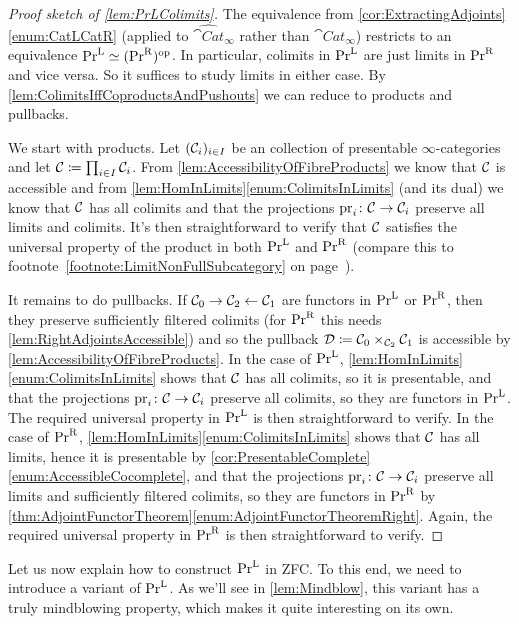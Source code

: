 \begin{proof}[Proof sketch of \cref{lem:PrLColimits}]
	The equivalence from \cref{cor:ExtractingAdjoints}\cref{enum:CatLCatR} (applied to $\widehat{\cat{Cat}}_\infty$ rather than $\cat{Cat}_\infty$) restricts to an equivalence $\mathrm{Pr}^{\mathrm{L}}\simeq (\mathrm{Pr}^{\mathrm{R}})^{\mathrm{op}}$. In particular, colimits in $\mathrm{Pr}^{\mathrm{L}}$ are just limits in $\mathrm{Pr}^{\mathrm{R}}$ and vice versa. So it suffices to study limits in either case. By \cref{lem:ColimitsIffCoproductsAndPushouts} we can reduce to products and pullbacks.
	
	We start with products. Let $(\mathcal{C}_i)_{i\in I}$ be an collection of presentable $\infty$-categories and let $\mathcal{C}\coloneqq \prod_{i\in I}\mathcal{C}_i$. From \cref{lem:AccessibilityOfFibreProducts} we know that $\mathcal{C}$ is accessible and from \cref{lem:HomInLimits}\cref{enum:ColimitsInLimits} (and its dual) we know that $\mathcal{C}$ has all colimits and that the projections $\operatorname{pr}_i\colon \mathcal{C}\rightarrow \mathcal{C}_i$ preserve all limits and colimits. It's then straightforward to verify that $\mathcal{C}$ satisfies the universal property of the product in both $\mathrm{Pr}^{\mathrm{L}}$ and $\mathrm{Pr}^{\mathrm{R}}$ (compare this to footnote~\cref{footnote:LimitNonFullSubcategory} on page~).
	
	It remains to do pullbacks. If $\mathcal{C}_0\rightarrow \mathcal{C}_2\leftarrow \mathcal{C}_1$ are functors in $\mathrm{Pr}^{\mathrm{L}}$ or $\mathrm{Pr}^{\mathrm{R}}$, then they preserve sufficiently filtered colimits (for $\mathrm{Pr}^{\mathrm{R}}$ this needs \cref{lem:RightAdjointsAccessible}) and so the pullback $\mathcal{D}\coloneqq\mathcal{C}_0\times_{\mathcal{C}_2}\mathcal{C}_1$ is accessible by \cref{lem:AccessibilityOfFibreProducts}. In the case of $\mathrm{Pr}^{\mathrm{L}}$, \cref{lem:HomInLimits}\cref{enum:ColimitsInLimits} shows that $\mathcal{C}$ has all colimits, so it is presentable, and that the projections $\operatorname{pr}_i\colon \mathcal{C}\rightarrow \mathcal{C}_i$ preserve all colimits, so they are functors in $\mathrm{Pr}^{\mathrm{L}}$. The required universal property in $\mathrm{Pr}^{\mathrm{L}}$ is then straightforward to verify. In the case of $\mathrm{Pr}^{\mathrm{R}}$, \cref{lem:HomInLimits}\cref{enum:ColimitsInLimits} shows that $\mathcal{C}$ has all limits, hence it is presentable by \cref{cor:PresentableComplete}\cref{enum:AccessibleCocomplete}, and that the projections $\operatorname{pr}_i\colon \mathcal{C}\rightarrow \mathcal{C}_i$ preserve all limits and sufficiently filtered colimits, so they are functors in $\mathrm{Pr}^{\mathrm{R}}$ by \cref{thm:AdjointFunctorTheorem}\cref{enum:AdjointFunctorTheoremRight}. Again, the required universal property in $\mathrm{Pr}^{\mathrm{R}}$ is then straightforward to verify.
\end{proof}
Let us now explain how to construct $\mathrm{Pr}^{\mathrm{L}}$ in ZFC. To this end, we need to introduce a variant of $\mathrm{Pr}^{\mathrm{L}}$. As we'll see in \cref{lem:Mindblow}, this variant has a truly mindblowing property, which makes it quite interesting on its own.
